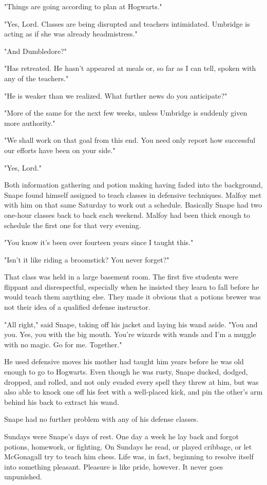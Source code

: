 "Things are going according to plan at Hogwarts."

"Yes, Lord. Classes are being disrupted and teachers intimidated. Umbridge is acting as if she was already headmistress."

"And Dumbledore?"

"Has retreated. He hasn't appeared at meals or, so far as I can tell, spoken with any of the teachers."

"He is weaker than we realized. What further news do you anticipate?"

"More of the same for the next few weeks, unless Umbridge is suddenly given more authority."

"We shall work on that goal from this end. You need only report how successful our efforts have been on your side."

"Yes, Lord."

Both information gathering and potion making having faded into the background, Snape found himself assigned to teach classes in defensive techniques. Malfoy met with him on that same Saturday to work out a schedule. Basically Snape had two one-hour classes back to back each weekend. Malfoy had been thick enough to schedule the first one for that very evening.

"You know it's been over fourteen years since I taught this."

"Isn't it like riding a broomstick? You never forget?"

That class was held in a large basement room. The first five students were flippant and disrespectful, especially when he insisted they learn to fall before he would teach them anything else. They made it obvious that a potions brewer was not their idea of a qualified defense instructor.

"All right," said Snape, taking off his jacket and laying his wand aside. "You and you. Yes, you with the big mouth. You're wizards with wands and I'm a muggle with no magic. Go for me. Together."

He used defensive moves his mother had taught him years before he was old enough to go to Hogwarts. Even though he was rusty, Snape ducked, dodged, dropped, and rolled, and not only evaded every spell they threw at him, but was also able to knock one off his feet with a well-placed kick, and pin the other's arm behind his back to extract his wand.

Snape had no further problem with any of his defense classes.

Sundays were Snape's days of rest. One day a week he lay back and forgot potions, homework, or fighting. On Sundays he read, or played cribbage, or let McGonagall try to teach him chess. Life was, in fact, beginning to resolve itself into something pleasant. Pleasure is like pride, however. It never goes unpunished.


